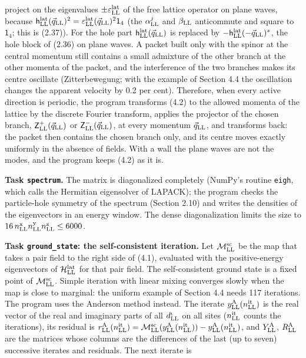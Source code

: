 \documentclass[
  10pt,
]{article}
\begin{document}
project on the eigenvalues \(\pm\varepsilon^{\rm lat}_{\rm LL}\) of the
free lattice operator on plane waves, because
\(\mathsf h^{\rm lat}_{\rm LL}(\vec q_{\rm LL})^2=\varepsilon^{\rm lat}_{\rm LL}(\vec q_{\rm LL})^2\mathsf 1_4\)
(the \(\alpha^j_{\rm LL}\) and \(\beta_{\rm LL}\) anticommute and square
to \(\mathsf 1_4\); this is (2.37)). For the hole part
\(\mathsf h^{\rm lat}_{\rm LL}(\vec q_{\rm LL})\) is replaced by
\(-\mathsf h^{\rm lat}_{\rm LL}(-\vec q_{\rm LL})^*\), the hole block of
(2.36) on plane waves. A packet built only with the spinor at the
central momentum still contains a small admixture of the other branch at
the other momenta of the packet, and the interference of the two
branches makes its centre oscillate (Zitterbewegung; with the example of
Section 4.4 the oscillation changes the apparent velocity by 0.2 per
cent). Therefore, when every active direction is periodic, the program
transforms (4.2) to the allowed momenta of the lattice by the discrete
Fourier transform, applies the projector of the chosen branch,
\(\mathsf Z^+_{\rm LL}(\vec q_{\rm LL})\) or
\(\mathsf Z^-_{\rm LL}(\vec q_{\rm LL})\), at every momentum
\(\vec q_{\rm LL}\), and transforms back: the packet then contains the
chosen branch only, and its centre moves exactly uniformly in the
absence of fields. With a wall the plane waves are not the modes, and
the program keeps (4.2) as it is.

\textbf{Task \texttt{spectrum}.} The matrix is diagonalized completely
(NumPy's routine \texttt{eigh}, which calls the Hermitian eigensolver of
LAPACK); the program checks the particle-hole symmetry of the spectrum
(Section 2.10) and writes the densities of the eigenvectors in an energy
window. The dense diagonalization limits the size to
\(16\,n^{\rm x}_{\rm LL}n^{\rm y}_{\rm LL}n^{\rm z}_{\rm LL}\le6000\).

\textbf{Task \texttt{ground\_state}: the self-consistent iteration.} Let
\(\mathcal M^{\rm sc}_{\rm LL}\) be the map that takes a pair field to
the right side of (4.1), evaluated with the positive-energy eigenvectors
of \(\mathcal H^{\rm lat}_{\rm LL}\) for that pair field. The
self-consistent ground state is a fixed point of
\(\mathcal M^{\rm sc}_{\rm LL}\). Simple iteration with linear mixing
converges slowly when the map is close to marginal: the uniform example
of Section 4.4 needs 117 iterations. The program uses the Anderson
method instead. The iterate \(y^{\rm A}_{\rm LL}(n^{\rm it}_{\rm LL})\)
is the real vector of the real and imaginary parts of all
\(d^\iota_{\rm LL}\) on all sites (\(n^{\rm it}_{\rm LL}\) counts the
iterations), its residual is
\(r^{\rm A}_{\rm LL}(n^{\rm it}_{\rm LL})=\mathcal M^{\rm sc}_{\rm LL}(y^{\rm A}_{\rm LL}(n^{\rm it}_{\rm LL}))-y^{\rm A}_{\rm LL}(n^{\rm it}_{\rm LL})\),
and \(Y^{\rm A}_{\rm LL}\), \(R^{\rm A}_{\rm LL}\) are the matrices
whose columns are the differences of the last (up to seven) successive
iterates and residuals. The next iterate is
\end{document}
